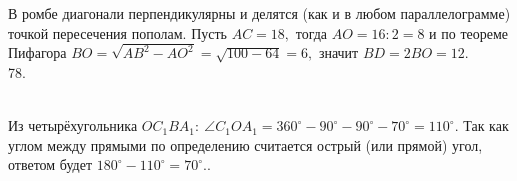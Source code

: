 \documentclass[12pt]{article}
\begin{document}
В ромбе диагонали перпендикулярны и делятся (как и в любом параллелограмме) точкой пересечения пополам. Пусть $AC=18,$ тогда $AO=16:2=8$ и по теореме Пифагора $BO=\sqrt{AB^2-AO^2}=\sqrt{100-64}=6,$ значит $BD=2BO=12.$\\
78. \begin{figure}[ht!]
\end{figure}\\
Из четырёхугольника $OC_1BA_1:\ \angle C_1OA_1=360^\circ-90^\circ-90^\circ-70^\circ=110^\circ.$ Так как углом между прямыми по определению считается острый (или прямой) угол, ответом будет $180^\circ-110^\circ=70^\circ.$\newpage{}. \begin{figure}[ht!]
\end{figure}\\
\end{document}
